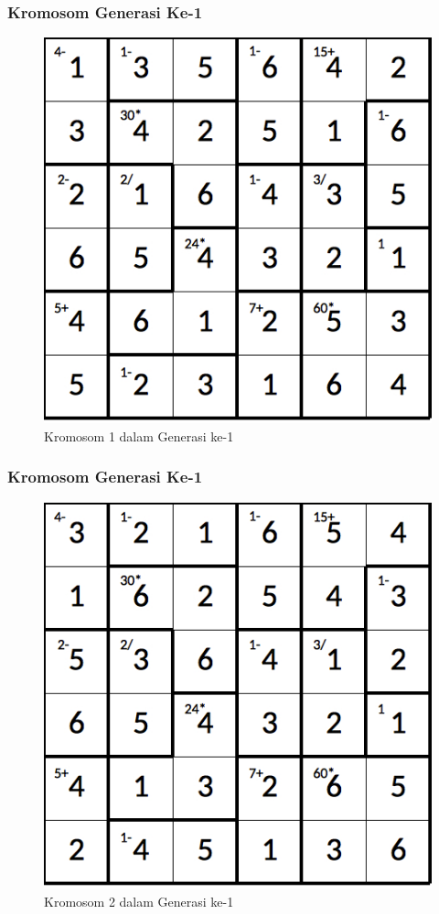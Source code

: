 \documentclass{beamer}
\begin{document}
\begin{frame}
\frametitle{Kromosom Generasi Ke-1}
\begin{figure}
\centering
\captionsetup{justification=centering}
\includegraphics[scale=0.333]{Gambar/hybridgenetic/Generation1Chromosome1}
\caption[Kromosom 1 dalam Generasi ke-1]{Kromosom 1 dalam Generasi ke-1}
\label{fig:analisisg1k1}
\end{figure}
\end{frame}

\note{

}

\begin{frame}
\frametitle{Kromosom Generasi Ke-1}
\begin{figure}
\centering
\captionsetup{justification=centering}
\includegraphics[scale=0.333]{Gambar/hybridgenetic/Generation1Chromosome2}
\caption[Kromosom 2 dalam Generasi ke-1]{Kromosom 2 dalam Generasi ke-1}
\label{fig:analisisg1k2}
\end{figure}
\end{frame}
\end{document}
